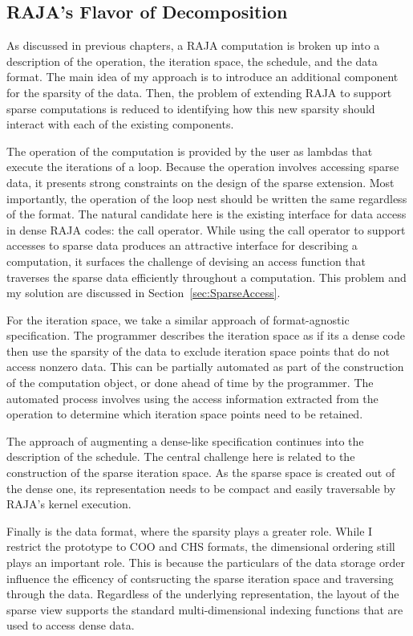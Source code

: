 \subsection{RAJA's Flavor of Decomposition}
As discussed in previous chapters, a RAJA computation is broken up into a description of the operation, the iteration space, the schedule, and the data format.
The main idea of my approach is to introduce an additional component for the sparsity of the data.
Then, the problem of extending RAJA to support sparse computations is reduced to identifying how this new sparsity should interact with each of the existing components.

The operation of the computation is provided by the user as lambdas that execute the iterations of a loop. 
Because the operation involves accessing sparse data, it presents strong constraints on the design of the sparse extension. 
Most importantly, the operation of the loop nest should be written the same regardless of the format. 
The natural candidate here is the existing interface for data access in dense RAJA codes: the call operator. 
While using the call operator to support accesses to sparse data produces an attractive interface for describing a computation, it surfaces the challenge of devising an access function that traverses the sparse data efficiently throughout a computation. This problem and my solution are discussed in Section~\ref{sec:SparseAccess}.

For the iteration space, we take a similar approach of format-agnostic specification.
The programmer describes the iteration space as if its a dense code then use the sparsity of the data to exclude iteration space points that do not access nonzero data.
This can be partially automated as part of the construction of the computation object, or done ahead of time by the programmer.
The automated process involves using the access information extracted from the operation to determine which iteration space points need to be retained.

The approach of augmenting a dense-like specification continues into the description of the schedule. 
The central challenge here is related to the construction of the sparse iteration space. 
As the sparse space is created out of the dense one, its representation needs to be compact and easily traversable by RAJA's kernel execution. 

Finally is the data format, where the sparsity plays a greater role.
While I restrict the prototype to COO and CHS formats, the dimensional ordering still plays an important role.
This is because the particulars of the data storage order influence the efficency of contsructing the sparse iteration space and traversing through the data.
Regardless of the underlying representation, the layout of the sparse view supports the standard multi-dimensional indexing functions that are used to access dense data.


